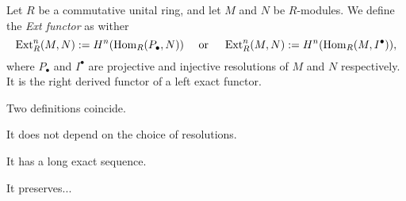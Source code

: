 \documentclass{../../large}
\begin{document}
\begin{prb}
Let $R$ be a commutative unital ring, and let $M$ and $N$ be $R$-modules.
We define the \emph{Ext functor} as wither
\[\operatorname{Ext}_R^n(M,N):=H^n(\operatorname{Hom}_R(P_\bullet,N))\quad\text{ or }\quad\operatorname{Ext}_R^n(M,N):=H^n(\operatorname{Hom}_R(M,I^\bullet)),\]
where $P_\bullet$ and $I^\bullet$ are projective and injective resolutions of $M$ and $N$ respectively.
It is the right derived functor of a left exact functor.
\begin{parts}
\item Two definitions coincide.
\item It does not depend on the choice of resolutions.
\item It has a long exact sequence.
\item It preserves...
\end{parts}
\end{prb}
\end{document}
